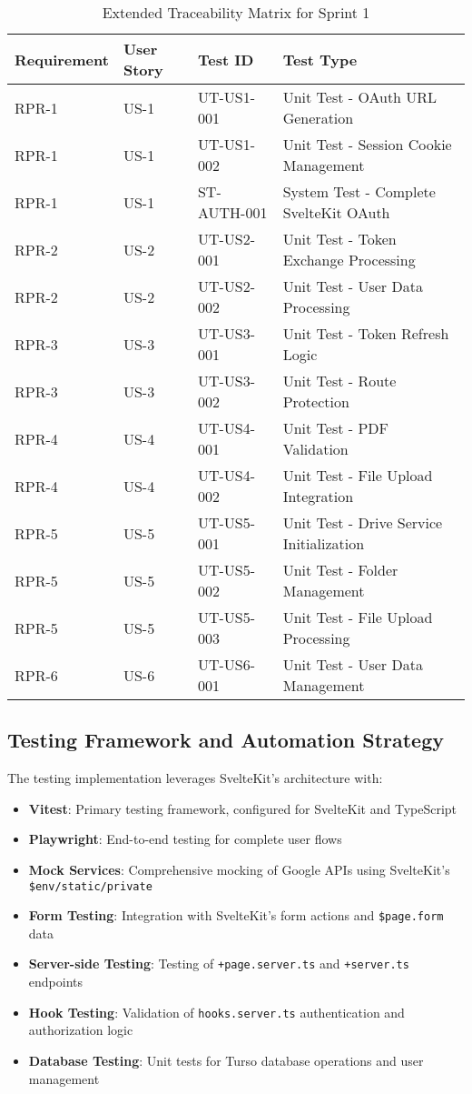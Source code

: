 \documentclass[12pt]{article}
\begin{document}
\begin{longtable}{|l|l|l|l|}
  \caption{Extended Traceability Matrix for Sprint 1}
  \label{tab:extended-traceability} \\
  \hline
  \textbf{Requirement} & \textbf{User Story} & \textbf{Test ID} & \textbf{Test Type} \\
  \hline
  RPR-1 & US-1 & UT-US1-001 & Unit Test - OAuth URL Generation \\
  RPR-1 & US-1 & UT-US1-002 & Unit Test - Session Cookie Management \\
  RPR-1 & US-1 & ST-AUTH-001 & System Test - Complete SvelteKit OAuth \\
  \hline
  RPR-2 & US-2 & UT-US2-001 & Unit Test - Token Exchange Processing \\
  RPR-2 & US-2 & UT-US2-002 & Unit Test - User Data Processing \\
  \hline
  RPR-3 & US-3 & UT-US3-001 & Unit Test - Token Refresh Logic \\
  RPR-3 & US-3 & UT-US3-002 & Unit Test - Route Protection \\
  \hline
  RPR-4 & US-4 & UT-US4-001 & Unit Test - PDF Validation \\
  RPR-4 & US-4 & UT-US4-002 & Unit Test - File Upload Integration \\
  \hline
  RPR-5 & US-5 & UT-US5-001 & Unit Test - Drive Service Initialization \\
  RPR-5 & US-5 & UT-US5-002 & Unit Test - Folder Management \\
  RPR-5 & US-5 & UT-US5-003 & Unit Test - File Upload Processing \\
  \hline
  RPR-6 & US-6 & UT-US6-001 & Unit Test - User Data Management \\
  \hline
\end{longtable}

\subsection{Testing Framework and Automation Strategy}

The testing implementation leverages SvelteKit's architecture with:

\begin{itemize}
  \item \textbf{Vitest}: Primary testing framework, configured for SvelteKit and TypeScript
  \item \textbf{Playwright}: End-to-end testing for complete user flows
  \item \textbf{Mock Services}: Comprehensive mocking of Google APIs using SvelteKit's \texttt{\$env/static/private}
  \item \textbf{Form Testing}: Integration with SvelteKit's form actions and \texttt{\$page.form} data
  \item \textbf{Server-side Testing}: Testing of \texttt{+page.server.ts} and \texttt{+server.ts} endpoints
  \item \textbf{Hook Testing}: Validation of \texttt{hooks.server.ts} authentication and authorization logic
  \item \textbf{Database Testing}: Unit tests for Turso database operations and user management
\end{itemize}
\end{document}
